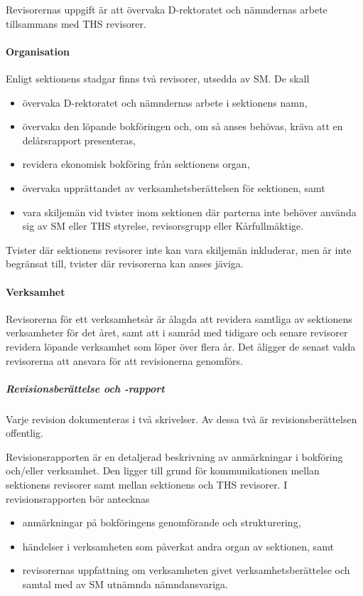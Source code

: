 \documentclass{dgovdoc}
\begin{document}
Revisorernas uppgift är att övervaka D-rektoratet och nämndernas arbete
tillsammans med THS revisorer.

\paragraph{Organisation}

Enligt sektionens stadgar finns två revisorer, utsedda av SM. De skall

\begin{itemize}
  \item övervaka D-rektoratet och nämndernas arbete i sektionens namn,
  \item övervaka den löpande bokföringen och, om så anses behövas, kräva att en
    delårsrapport presenteras,
  \item revidera ekonomisk bokföring från sektionens organ,
  \item övervaka upprättandet av verksamhetsberättelsen för sektionen, samt
  \item vara skiljemän vid tvister inom sektionen där parterna inte behöver
    använda sig av SM eller THS styrelse, revisorsgrupp eller Kårfullmäktige.
\end{itemize}

Tvister där sektionens revisorer inte kan vara skiljemän inkluderar, men är
inte begränsat till, tvister där revisorerna kan anses jäviga.

\paragraph{Verksamhet}

Revisorerna för ett verksamhetsår är ålagda att revidera samtliga av sektionens
verksamheter för det året, samt att i samråd med tidigare och senare revisorer
revidera löpande verksamhet som löper över flera år. Det åligger de senast
valda revisorerna att ansvara för att revisionerna genomförs.

\subparagraph{Revisionsberättelse och -rapport}

Varje revision dokumenteras i två skrivelser. Av dessa två är
revisionsberättelsen offentlig.

Revisionsrapporten är en detaljerad beskrivning av anmärkningar i bokföring
och/eller verksamhet. Den ligger till grund för kommunikationen mellan
sektionens revisorer samt mellan sektionens och THS revisorer. I
revisionsrapporten bör antecknas

\begin{itemize}
  \item anmärkningar på bokföringens genomförande och strukturering,
  \item händelser i verksamheten som påverkat andra organ av sektionen, samt
  \item revisorernas uppfattning om verksamheten givet verksamhetsberättelse
    och samtal med av SM utnämnda nämndansvariga.
\end{itemize}
\end{document}
